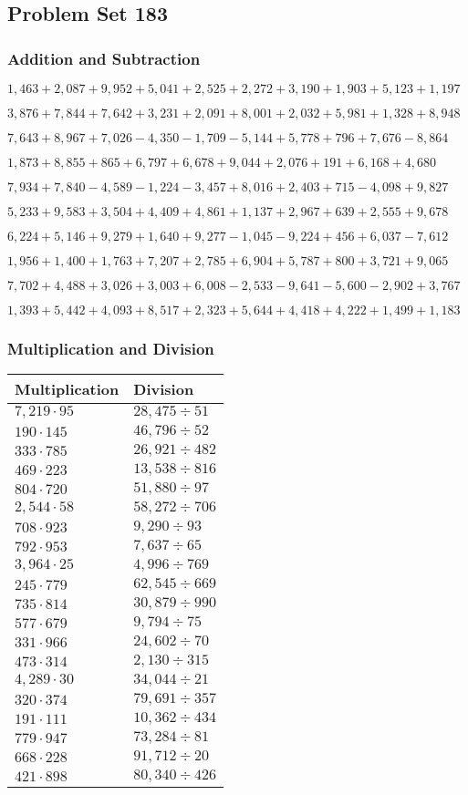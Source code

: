 \hypertarget{problem-set-183}{%
\subsection{Problem Set 183}\label{problem-set-183}}

\hypertarget{addition-and-subtraction}{%
\subsubsection{Addition and
Subtraction}\label{addition-and-subtraction}}

\(1,463+2,087+9,952+5,041+2,525+2,272+3,190+1,903+5,123+1,197\)

\(3,876+7,844+7,642+3,231+2,091+8,001+2,032+5,981+1,328+8,948\)

\(7,643+8,967+7,026-4,350-1,709-5,144+5,778+796+7,676-8,864\)

\(1,873+8,855+865+6,797+6,678+9,044+2,076+191+6,168+4,680\)

\(7,934+7,840-4,589-1,224-3,457+8,016+2,403+715-4,098+9,827\)

\(5,233+9,583+3,504+4,409+4,861+1,137+2,967+639+2,555+9,678\)

\(6,224+5,146+9,279+1,640+9,277-1,045-9,224+456+6,037-7,612\)

\(1,956+1,400+1,763+7,207+2,785+6,904+5,787+800+3,721+9,065\)

\(7,702+4,488+3,026+3,003+6,008-2,533-9,641-5,600-2,902+3,767\)

\(1,393+5,442+4,093+8,517+2,323+5,644+4,418+4,222+1,499+1,183\)

\hypertarget{multiplication-and-division}{%
\subsubsection{Multiplication and
Division}\label{multiplication-and-division}}

\begin{longtable}[]{@{}ll@{}}
\toprule
Multiplication & Division\tabularnewline
\midrule
\endhead
\(7,219\cdot95\) & \(28,475÷51\)\tabularnewline
\(190\cdot145\) & \(46,796÷52\)\tabularnewline
\(333\cdot785\) & \(26,921÷482\)\tabularnewline
\(469\cdot223\) & \(13,538÷816\)\tabularnewline
\(804\cdot720\) & \(51,880÷97\)\tabularnewline
\(2,544\cdot58\) & \(58,272÷706\)\tabularnewline
\(708\cdot923\) & \(9,290÷93\)\tabularnewline
\(792\cdot953\) & \(7,637÷65\)\tabularnewline
\(3,964\cdot25\) & \(4,996÷769\)\tabularnewline
\(245\cdot779\) & \(62,545÷669\)\tabularnewline
\(735\cdot814\) & \(30,879÷990\)\tabularnewline
\(577\cdot679\) & \(9,794÷75\)\tabularnewline
\(331\cdot966\) & \(24,602÷70\)\tabularnewline
\(473\cdot314\) & \(2,130÷315\)\tabularnewline
\(4,289\cdot30\) & \(34,044÷21\)\tabularnewline
\(320\cdot374\) & \(79,691÷357\)\tabularnewline
\(191\cdot111\) & \(10,362÷434\)\tabularnewline
\(779\cdot947\) & \(73,284÷81\)\tabularnewline
\(668\cdot228\) & \(91,712÷20\)\tabularnewline
\(421\cdot898\) & \(80,340÷426\)\tabularnewline
\bottomrule
\end{longtable}
